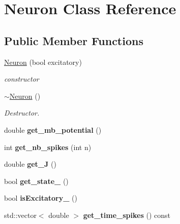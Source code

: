 \hypertarget{classNeuron}{\section{Neuron Class Reference}
\label{classNeuron}
}
\subsection*{Public Member Functions}
\begin{DoxyCompactItemize}
\item 
\hyperlink{classNeuron_af1ec9cf091aa834daf3078d02e2ad75a}{Neuron} (bool excitatory)
\begin{DoxyCompactList}\small\item\em constructor \end{DoxyCompactList}\item 
\hyperlink{classNeuron_a94a250ce7e167760e593979b899745b1}{$\sim$\-Neuron} ()
\begin{DoxyCompactList}\small\item\em Destructor. \end{DoxyCompactList}\item 
\hypertarget{classNeuron_a4e216ab0a75e35fcfa6aa17ff067d5dd}{double {\bfseries get\-\_\-mb\-\_\-potential} ()}\label{classNeuron_a4e216ab0a75e35fcfa6aa17ff067d5dd}

\item 
\hypertarget{classNeuron_a60eceea9f3daf56a3a5e5902ec6369d1}{int {\bfseries get\-\_\-nb\-\_\-spikes} (int n)}\label{classNeuron_a60eceea9f3daf56a3a5e5902ec6369d1}

\item 
\hypertarget{classNeuron_ae5eaa4d1bc78f7c886a06d5b2904ce7e}{double {\bfseries get\-\_\-\-J} ()}\label{classNeuron_ae5eaa4d1bc78f7c886a06d5b2904ce7e}

\item 
\hypertarget{classNeuron_a13ffa808d41f88c8dadcf6cbb6ebf009}{bool {\bfseries get\-\_\-state\-\_\-} ()}\label{classNeuron_a13ffa808d41f88c8dadcf6cbb6ebf009}

\item 
\hypertarget{classNeuron_a661539abd22136fafa8b7ded30182e5a}{bool {\bfseries is\-Excitatory\-\_\-} ()}\label{classNeuron_a661539abd22136fafa8b7ded30182e5a}

\item 
\hypertarget{classNeuron_a39ed492bf741cd6883bd6b56f6c2f37b}{std\-::vector$<$ double $>$ {\bfseries get\-\_\-time\-\_\-spikes} () const }\label{classNeuron_a39ed492bf741cd6883bd6b56f6c2f37b}


\end{DoxyCompactItemize}
